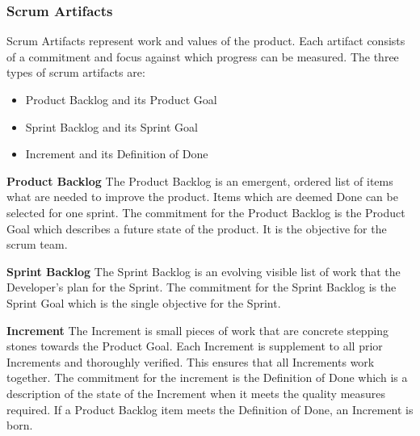 \subsubsection{Scrum Artifacts}
Scrum Artifacts\cite{scrum_guide} represent work and values of the product. Each artifact consists of a commitment 
and focus against which progress can be measured. The three types of scrum artifacts are:

\begin{itemize}
    \item Product Backlog and its Product Goal
    \item Sprint Backlog and its Sprint Goal
    \item Increment and its Definition of Done
\end{itemize}

\textbf{Product Backlog}\newline
The Product Backlog\cite{scrum_guide} is an emergent, ordered list of items what are needed to improve the product. 
Items which are deemed Done can be selected for one sprint. The commitment for the Product Backlog is the Product 
Goal which describes a future state of the product. It is the objective for the scrum team.

\textbf{Sprint Backlog}\newline
The Sprint Backlog\cite{what_is_scrum} is an evolving visible list of work that the Developer's plan for the Sprint. 
The commitment for the Sprint Backlog is the Sprint Goal\cite{scrum_guide} which is the single objective for the Sprint. 

\textbf{Increment}\newline
The Increment\cite{scrum_guide} is small pieces of work that are concrete stepping stones towards the Product Goal. Each 
Increment is supplement to all prior Increments and thoroughly verified. This ensures that all Increments work together. 
The commitment for the increment is the Definition of Done\cite{scrum_guide} which is a description of the state 
of the Increment when it meets the quality measures required. If a Product Backlog item meets the Definition of Done, an 
Increment is born. 